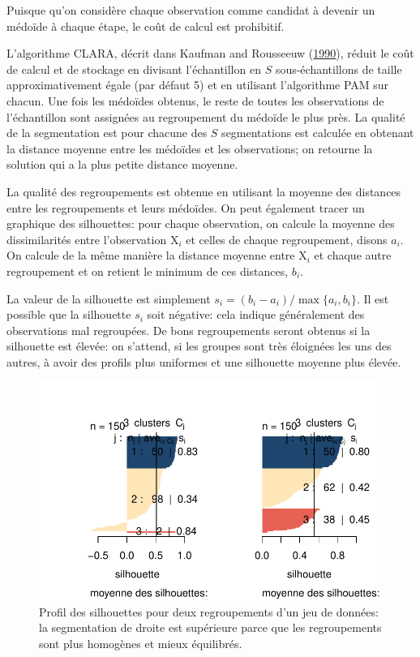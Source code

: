 \documentclass[
  11pt,
  letterpaper,
]{scrbook}
\theoremstyle{definition}
\theoremstyle{remark}
\begin{document}
Puisque qu'on considère chaque observation comme candidat à devenir un
médoïde à chaque étape, le coût de calcul est prohibitif.

L'algorithme CLARA, décrit dans Kaufman and Rousseeuw
(\protect\hyperlink{ref-Kaufman.Rousseeuw:1990}{1990}), réduit le coût
de calcul et de stockage en divisant l'échantillon en \(S\)
sous-échantillons de taille approximativement égale (par défaut 5) et en
utilisant l'algorithme PAM sur chacun. Une fois les médoïdes obtenus, le
reste de toutes les observations de l'échantillon sont assignées au
regroupement du médoïde le plus près. La qualité de la segmentation est
pour chacune des \(S\) segmentations est calculée en obtenant la
distance moyenne entre les médoïdes et les observations; on retourne la
solution qui a la plus petite distance moyenne.

La qualité des regroupements est obtenue en utilisant la moyenne des
distances entre les regroupements et leurs médoïdes. On peut également
tracer un graphique des silhouettes: pour chaque observation, on calcule
la moyenne des dissimilarités entre l'observation \(\mathrm{X}_i\) et
celles de chaque regroupement, disons \(a_i\). On calcule de la même
manière la distance moyenne entre \(\mathrm{X}_i\) et chaque autre
regroupement et on retient le minimum de ces distances, \(b_i\).

La valeur de la silhouette est simplement
\(s_i=(b_i-a_i)/\max\{a_i, b_i\}\). Il est possible que la silhouette
\(s_i\) soit négative: cela indique généralement des observations mal
regroupées. De bons regroupements seront obtenus si la silhouette est
élevée: on s'attend, si les groupes sont très éloignées les uns des
autres, à avoir des profils plus uniformes et une silhouette moyenne
plus élevée.

\begin{figure}[ht!]

{\centering \includegraphics{./03-regroupements_files/figure-pdf/fig-silhouette-1.pdf}

}

\caption{\label{fig-silhouette}Profil des silhouettes pour deux
regroupements d'un jeu de données: la segmentation de droite est
supérieure parce que les regroupements sont plus homogènes et mieux
équilibrés.}

\end{figure}
\end{document}
